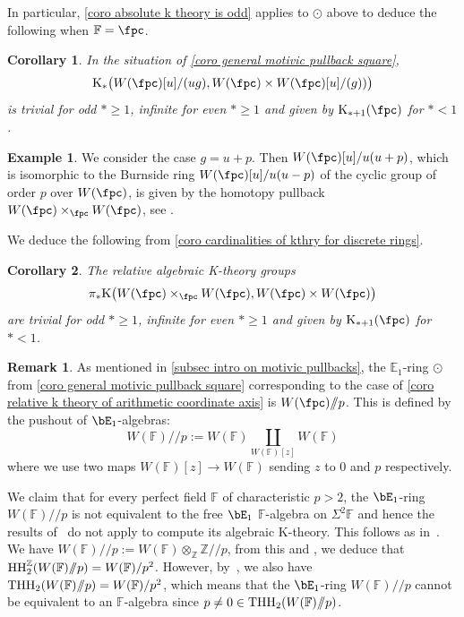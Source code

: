 \documentclass[english,10pt]{amsart}
\newcommand{\field}{\mathbb{F}}
\newtheorem{coro}{Corollary}[section]
\theoremstyle{definition}
\newtheorem{exam}{Example}[section]
\newtheorem{rema}{Remark}[section]
\numberwithin{equation}{section}
\DeclareMathOperator{\thh}{\ensuremath{\textup{THH}}}
\newcommand{\mmod}{/\!\!/}
\newcommand{\sslash}{\mmod}
\DeclareMathOperator{\hh}{\ensuremath{\textup{HH}}}
\newcommand{\z}{\mathbb{Z}}
\newcommand{\pis}{\pi_*}
\begin{document}
In particular, \autoref{coro absolute k theory is odd} applies to $ \odot$ above to deduce the following when $\field = \fpc$. 

\begin{coro}\label{coro cardinalities of kthry for discrete rings}
In the situation of \autoref{coro general motivic pullback square}, 
\[\mathrm{K}_*\big(W(\fpc)[u]/(ug),W(\fpc) \times W(\fpc)[u]/(g)) \big)\]
is trivial for odd $*\geq 1$,  infinite for even $* \geq 1$ and given by $\mathrm{K}_{*+1}(\fpc)$ for $*<1$.
\end{coro}

\begin{exam}
We consider the case $g = u+p$. Then $W(\fpc)[u]/u(u+p)$, which is isomorphic to the Burnside ring $W(\fpc)[u]/u(u-p)$ of the cyclic group of order $p$ over $W(\fpc)$, is given by the homotopy pullback $W(\fpc) \times_{\fpc} W(\fpc)$, see \cite[Example~4.31]{land2023kthrypushouts}. 
\end{exam}

We deduce the following from \autoref{coro cardinalities of kthry for discrete rings}.

\begin{coro}\label{coro relative k theory of arithmetic coordinate axis}
The relative algebraic K-theory groups
\[\pis \mathrm{K}\big(W(\fpc)\times_{\fpc} W(\fpc), W(\fpc) \times W(\fpc) \big) \]
are trivial for odd $*\geq 1$,  infinite for even $* \geq 1$ and given by $\mathrm{K}_{*+1}(\fpc)$ for $*<1$. 
\end{coro}

\begin{rema}\label{rema nonformality}
As mentioned in \autoref{subsec intro on motivic pullbacks}, the $\mathbb{E}_1$-ring $\odot$  from \autoref{coro general motivic pullback square}
corresponding to the  case of \autoref{coro relative k theory of arithmetic coordinate axis} is  $W(\fpc)\sslash p$. This is defined by the pushout of $\bE_1$-algebras:
\begin{equation}\label{eq defining mod mod p guy}
W(\field) \sslash p := W(\field) \coprod_{W(\field)[z]} W(\field)
\end{equation}
where we use two maps $W(\field)[z] \to W(\field)$ sending $z$ to $0$ and $p$ respectively.

We claim that  for every perfect field $\field$ of characteristic $p>2$, the $\bE_1$-ring $W(\field) \sslash p$ is not equivalent to the free $\bE_1$ $\field$-algebra on $\Sigma^2\field$ and hence the results of~\cite{bayindir2020kthryofthh} do not apply to compute its algebraic K-theory. This follows as in~\cite[Remark 4.33]{land2023kthrypushouts}. We have $W(\field) \sslash p:= W(\field) \otimes_{\z} \z\sslash p$, from this and \cite[Corollary 2.6]{davis2025cyclichomologyofzmodmodp}, we deduce that $\hh^{\z}_2(W(\field) \sslash p) = W(\field)/p^2$. However, by~\cite[Proposition IV.4.2]{nikolausscholze2018topologicalcyclic},  
 we also  have $\thh_2(W(\field) \sslash p) = W(\field)/p^2$, which means that the $\bE_1$-ring $W(\field)\sslash p$ cannot be equivalent to an $\field$-algebra since $p\neq 0 \in \thh_2(W(\field)\sslash p)$. 
\end{rema}
\end{document}
